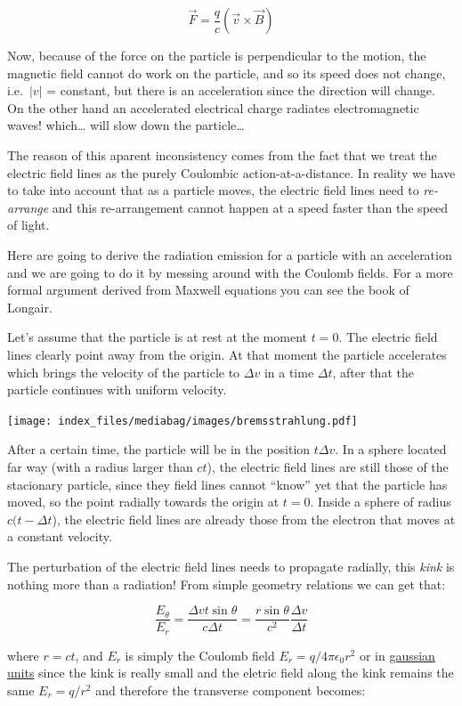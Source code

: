 \documentclass[
  letterpaper,
  DIV=11,
  numbers=noendperiod]{scrreprt}
\begin{document}
\[\vec{F} = \frac{q}{c}(\vec{v}\times \vec{B}) \]

Now, because of the force on the particle is perpendicular to the
motion, the magnetic field cannot do work on the particle, and so its
speed does not change, i.e.~\(|v|\) = constant, but there is an
acceleration since the direction will change. On the other hand an
accelerated electrical charge radiates electromagnetic waves!
which\ldots{} will slow down the particle\ldots{}

The reason of this aparent inconsistency comes from the fact that we
treat the electric field lines as the purely Coulombic
action-at-a-distance. In reality we have to take into account that as a
particle moves, the electric field lines need to \emph{re-arrange} and
this re-arrangement cannot happen at a speed faster than the speed of
light.

Here are going to derive the radiation emission for a particle with an
acceleration and we are going to do it by messing around with the
Coulomb fields. For a more formal argument derived from Maxwell
equations you can see the book of Longair.

Let's assume that the particle is at rest at the moment \(t=0\). The
electric field lines clearly point away from the origin. At that moment
the particle accelerates which brings the velocity of the particle to
\(\Delta v\) in a time \(\Delta t\), after that the particle continues
with uniform velocity.

\texttt{[image: index\_files/mediabag/images/bremsstrahlung.pdf]}

After a certain time, the particle will be in the position
\(t\Delta v\). In a sphere located far way (with a radius larger than
\(c t\)), the electric field lines are still those of the stacionary
particle, since they field lines cannot ``know'' yet that the particle
has moved, so the point radially towards the origin at \(t=0\). Inside a
sphere of radius \(c(t - \Delta t\)), the electric field lines are
already those from the electron that moves at a constant velocity.

The perturbation of the electric field lines needs to propagate
radially, this \emph{kink} is nothing more than a radiation! From simple
geometry relations we can get that:

\[\frac{E_\theta}{E_{r}} = \frac{\Delta v  t \sin\theta}{c\Delta t} = \frac{r \sin \theta}{c^2}\frac{\Delta v}{\Delta t}\]

where \(r = c t\), and \(E_r\) is simply the Coulomb field
\(E_r = q/4\pi\epsilon_0 r^2\) or in
\href{https://en.wikipedia.org/wiki/Gaussian_units}{gaussian units}
since the kink is really small and the eletric field along the kink
remains the same \(E_r = q/r^2\) and therefore the transverse component
becomes:
\end{document}
